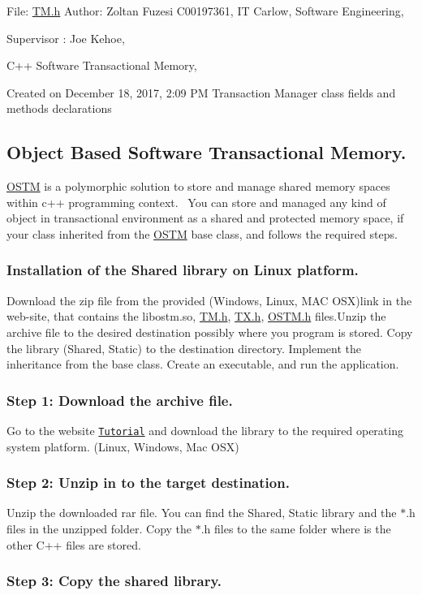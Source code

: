 File\+: \hyperlink{_t_m_8h}{T\+M.\+h} Author\+: Zoltan Fuzesi C00197361, IT Carlow, Software Engineering,

Supervisor \+: Joe Kehoe,

C++ Software Transactional Memory,

Created on December 18, 2017, 2\+:09 PM Transaction Manager class fields and methods declarations\hypertarget{index_OSTM}{}\subsection{Object Based Software Transactional Memory.}\label{index_OSTM}
\hyperlink{class_o_s_t_m}{O\+S\+TM} is a polymorphic solution to store and manage shared memory spaces within c++ programming context.~\newline
 You can store and managed any kind of object in transactional environment as a shared and protected memory space, if your class inherited from the \hyperlink{class_o_s_t_m}{O\+S\+TM} base class, and follows the required steps.\hypertarget{index_install_sec}{}\subsubsection{Installation of the Shared library on Linux platform.}\label{index_install_sec}
Download the zip file from the provided (Windows, Linux, M\+AC O\+SX)link in the web-\/site, that contains the libostm.\+so, \hyperlink{_t_m_8h}{T\+M.\+h}, \hyperlink{_t_x_8h}{T\+X.\+h}, \hyperlink{_o_s_t_m_8h}{O\+S\+T\+M.\+h} files.\+Unzip the archive file to the desired destination possibly where you program is stored. Copy the library (Shared, Static) to the destination directory. Implement the inheritance from the base class. Create an executable, and run the application.\hypertarget{index_step1}{}\subsubsection{Step 1\+: Download the archive file.}\label{index_step1}
Go to the website \href{http://serversite.info/ostm/#tutorial}{\tt Tutorial} and download the library to the required operating system platform. (Linux, Windows, Mac O\+SX)\hypertarget{index_step2}{}\subsubsection{Step 2\+: Unzip in to the target destination.}\label{index_step2}
Unzip the downloaded rar file. You can find the Shared, Static library and the $\ast$.h files in the unzipped folder. Copy the $\ast$.h files to the same folder where is the other C++ files are stored.\hypertarget{index_step3}{}\subsubsection{Step 3\+: Copy the shared library.}\label{index_step3}
